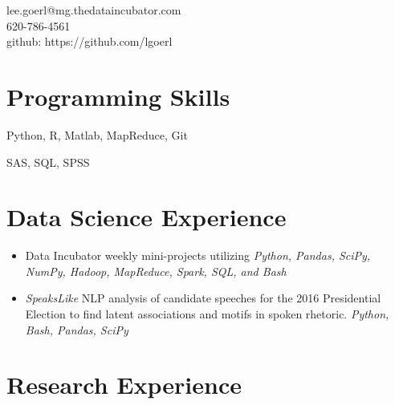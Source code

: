 \documentclass[a4paper,10pt,notitlepage]{article}
\begin{document}
\begin{multicols}{2}{
\noindent %

\noindent lee.goerl@mg.thedataincubator.com\\
620-786-4561\\
github: https://github.com/lgoerl
}
\end{multicols}
\vspace{-10pt}\section*{Programming Skills}
	\begin{description}
	\vspace{-5pt} \item[Primary Languages and Frameworks:] Python, R, Matlab, MapReduce, Git
	\item[Secondary Languages and Frameworks:] SAS, SQL, SPSS
	\end{description}

\section*{Data Science Experience}

	\begin{itemize}
		\vspace{-5pt}\item Data Incubator weekly mini-projects utilizing \emph{Python, Pandas, SciPy, NumPy, Hadoop, MapReduce, Spark, SQL, and Bash}
		\vspace{-5pt}\item \emph{SpeaksLike} NLP analysis of candidate speeches for the 2016 Presidential Election to find latent associations and motifs in spoken rhetoric. \emph{Python, Bash, Pandas, SciPy}
	\end{itemize}


\section*{Research Experience}
\end{document}
